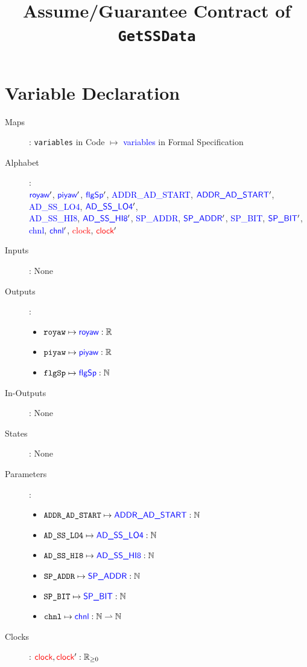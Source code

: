 \documentclass[fleqn,a4paper]{article}
\newcommand\var[1]{\texttt{#1}}
\newcommand\Var[1]{\textcolor{blue}{\textsf{#1}}}
\newcommand\clock{\textcolor{red}{\textsf{clock}}}
\begin{document}
\title{Assume/Guarantee Contract of \texttt{GetSSData}}
\author{}

\maketitle

\section{Variable Declaration}

\begin{description}
\item[Maps]:
\var{variables} in Code $\mapsto$ \Var{variables} in Formal Specification

\item[Alphabet]: \\
$\Var{royaw}'$,
$\Var{piyaw}'$,
$\Var{flgSp}'$,
\Var{ADDR\_AD\_START},
$\Var{ADDR\_AD\_START}'$,
\Var{AD\_SS\_LO4},
$\Var{AD\_SS\_LO4}'$, \\
\Var{AD\_SS\_HI8},
$\Var{AD\_SS\_HI8}'$,
\Var{SP\_ADDR},
$\Var{SP\_ADDR}'$,
\Var{SP\_BIT},
$\Var{SP\_BIT}'$,
\Var{chnl},
$\Var{chnl}'$,
\clock,
$\clock'$

\item[Inputs]: None

\item[Outputs]:
\begin{itemize}
\item $\var{royaw} \mapsto \Var{royaw} : \mathbb{R}$
\item $\var{piyaw} \mapsto \Var{piyaw} : \mathbb{R}$
\item $\var{flgSp} \mapsto \Var{flgSp} : \mathbb{N}$
\end{itemize}

\item[In-Outputs]: None

\item[States]: None

\item[Parameters]:
\begin{itemize}
\item $\var{ADDR\_AD\_START} \mapsto \Var{ADDR\_AD\_START} : \mathbb{N}$
\item $\var{AD\_SS\_LO4} \mapsto \Var{AD\_SS\_LO4} : \mathbb{N}$
\item $\var{AD\_SS\_HI8} \mapsto \Var{AD\_SS\_HI8} : \mathbb{N}$
\item $\var{SP\_ADDR} \mapsto \Var{SP\_ADDR} : \mathbb{N}$
\item $\var{SP\_BIT} \mapsto \Var{SP\_BIT} : \mathbb{N}$
\item $\var{chnl} \mapsto \Var{chnl} : \mathbb{N} \rightharpoonup \mathbb{N}$
\end{itemize}

\item[Clocks]:
$\clock,\clock' : \mathbb{R}_{\geq 0}$

\end{description}
\end{document}
